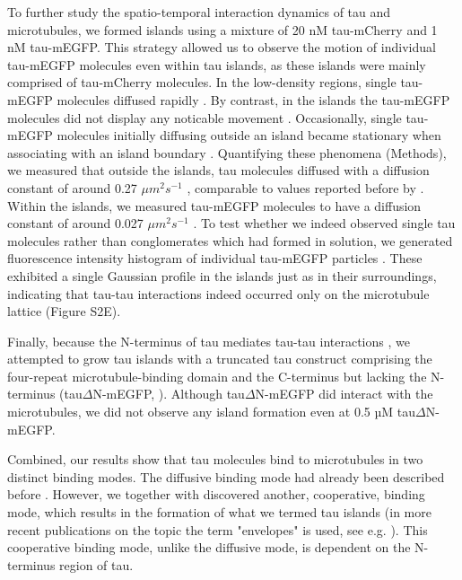 To further study the spatio-temporal interaction dynamics of tau and microtubules, we formed islands using a mixture of 20 nM tau-mCherry and 1 nM tau-mEGFP. This strategy allowed us to observe the motion of individual tau-mEGFP molecules even within tau islands, as these islands were mainly comprised of tau-mCherry molecules. In the low-density regions, single tau-mEGFP molecules diffused rapidly . By contrast, in the islands the tau-mEGFP molecules did not display any noticable movement . Occasionally, single tau-mEGFP molecules initially diffusing outside an island became stationary when associating with an island boundary . Quantifying these phenomena (Methods), we measured that outside the islands, tau molecules diffused with a diffusion constant of around 0.27 $\mu m^2s^{-1}$ , comparable to values reported before by \cite{Hinrichs2012b}. Within the islands, we measured tau-mEGFP molecules to have a diffusion constant of around 0.027 $\mu m^2s^{-1}$ . To test whether we indeed observed single tau molecules rather than conglomerates which had formed in solution, we generated fluorescence intensity histogram of individual tau-mEGFP particles . These exhibited a single Gaussian profile in the islands just as in their surroundings, indicating that tau-tau interactions indeed occurred only on the microtubule lattice (Figure S2E). \par

Finally, because the N-terminus of tau mediates tau-tau interactions \parencite{Gamblin2003}, we attempted to grow tau islands with a truncated tau construct comprising the four-repeat microtubule-binding domain and the C-terminus but lacking the N-terminus (tau$\Delta$N-mEGFP, ). Although tau$\Delta$N-mEGFP did interact with the microtubules, we did not observe any island formation even at 0.5 µM tau$\Delta$N-mEGFP.\par

Combined, our results show that tau molecules bind to microtubules in two distinct binding modes. The diffusive binding mode had already been described before \parencite{Hinrichs2012b}. However, we together with \cite{tan2019microtubules} discovered another, cooperative, binding mode, which results in the formation of what we termed tau islands (in more recent publications on the topic the term "envelopes" is used, see e.g. \cite{siahaan2022microtubule}). This cooperative binding mode, unlike the diffusive mode, is dependent on the N-terminus region of tau.

